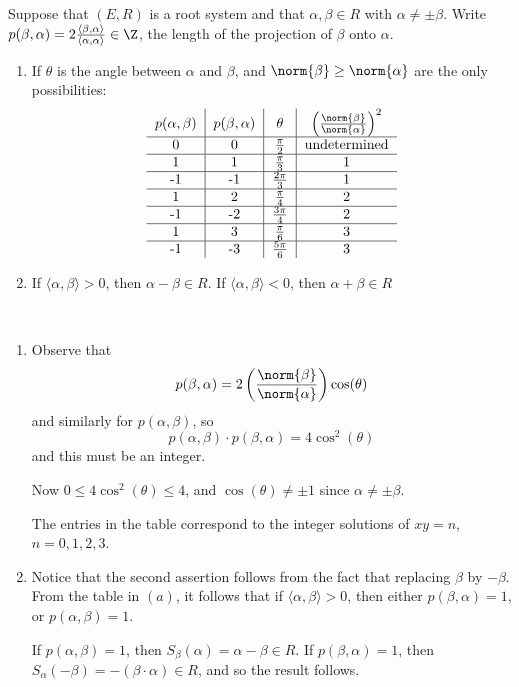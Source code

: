 \documentclass[x11names,reqno,14pt]{extarticle}
\begin{document}
Suppose that $(E,R)$ is a root system and that $\alpha,\beta\in R$ with $\alpha\neq\pm\beta$. Write $p(\beta,\alpha) = 2\frac{\langle\beta,\alpha\rangle}{\langle\alpha,\alpha\rangle}\in\Z$, the length of the projection of $\beta$ onto $\alpha$. 
\begin{enumerate}[label=(\alph*)]

\item If $\theta$ is the angle between $\alpha$ and $\beta$, and $\norm{\beta}\geq\norm{\alpha}$ are the only possibilities:
\[
\begin{tabular}{c|c|c|c}
$p(\alpha,\beta)$ & $p(\beta,\alpha)$ & $\theta$ & $\left(\frac{\norm{\beta}}{\norm{\alpha}}\right)^2$\\
\hline
0 & 0 & $\frac{\pi}{2}$ & undetermined \\
\hline
1&1&$\frac{\pi}{3}$ & 1\\
\hline
-1&-1&$\frac{2\pi}{3}$&1 \\
\hline
1&2&$\frac{\pi}{4}$&2\\
\hline
-1&-2&$\frac{3\pi}{4}$&2 \\
\hline
1&3&$\frac{\pi}{6}$&3 \\
\hline
-1&-3&$\frac{5\pi}{6}$&3\\
\end{tabular}
\]

\item If $\langle\alpha,\beta\rangle>0$, then $\alpha-\beta\in R$. If $\langle\alpha,\beta\rangle<0$, then $\alpha+\beta\in R$

\end{enumerate}

\proof
\,

\begin{enumerate}[label=(\alph*)]

\item Observe that 
\[
p(\beta,\alpha) = 2\left(\frac{\norm{\beta}}{\norm{\alpha}}\right)\cos(\theta)
\]
and similarly for $p(\alpha,\beta)$, so 
\[
p(\alpha,\beta)\cdot p(\beta,\alpha) = 4\cos^2(\theta)
\]
and this must be an integer. 

Now $0 \leq 4\cos^2(\theta)\leq4$, and $\cos(\theta) \neq \pm 1$ since $\alpha\neq\pm\beta$. 

The entries in the table correspond to the integer solutions of $xy = n$, $n = 0, 1, 2, 3$. 

\item Notice that the second assertion follows from the fact that replacing $\beta$ by $-\beta$. From the table in $(a)$, it follows that if $\langle\alpha,\beta\rangle>0$, then either $p(\beta,\alpha)=1$, or $p(\alpha,\beta)=1$. 

If $p(\alpha,\beta)=1$, then $S_\beta(\alpha)=\alpha-\beta\in R$. If $p(\beta,\alpha)= 1$, then $S_\alpha(-\beta) = -(\beta\cdot\alpha)\in R$, and so the result follows. 

\end{enumerate}
\end{document}
